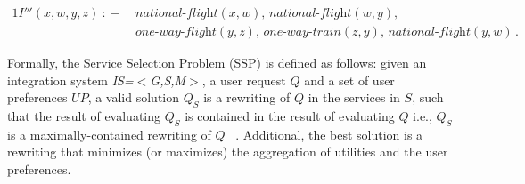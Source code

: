 \documentclass{llncs}
\newcommand{\tup}[1]{\langle #1 \rangle}
\newcommand{\vvec}[1]{\mathbf{#1}}
\newcommand{\join}{\bowtie}
\newcommand{\R}{\mathcal{R}}
\newcommand{\qrule}{:\!\!-}
\newcommand{\nationalFlight}{\textit{national-flight}}
\newcommand{\onewayFlight}{\textit{one-way-flight}}
\newcommand{\onewayTrain}{\textit{one-way-train}}
\begin{document}
{\begin{alignat*}{1}
 I'''(x,w,y,z)\ \qrule\ & \nationalFlight(x,w),\,\nationalFlight(w,y), \,\\
& \onewayFlight(y,z), \,\onewayTrain(z,y), \,\nationalFlight(y,w)\,. 
\end{alignat*}

Formally, the Service Selection Problem (SSP) is defined as follows:
given an integration system {\it IS=$<$G,S,M$>$}, a user request $Q$ and
a set of user preferences $UP$, a valid solution $Q_S$ is a rewriting of
$Q$ in the services in $S$, such that the result of evaluating $Q_S$ is
contained in the result of evaluating $Q$ i.e., $Q_S$ is a maximally-contained
rewriting of $Q$ ~\cite{RajaramanSU95,Ullman00}. Additional, the best solution
is a rewriting  that minimizes (or maximizes) the aggregation of utilities
and the user preferences.   


}
\end{document}
